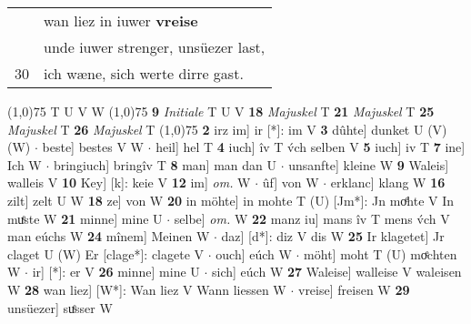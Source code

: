 \documentclass[8pt,a4paper,notitlepage]{article}
\begin{document}
\begin{table}[ht]
\begin{minipage}[t]{0.5\linewidth}
\begin{tabular}{rl}
 & wan liez in iuwer \textbf{vreise}\\ 
 & unde iuwer strenger, unsüezer last,\\ 
30 & ich wæne, sich werte dirre gast.\\ 
\end{tabular}
\scriptsize
\line(1,0){75} \newline
T U V W \newline
\line(1,0){75} \newline
\textbf{9} \textit{Initiale} T U V  \textbf{18} \textit{Majuskel} T  \textbf{21} \textit{Majuskel} T  \textbf{25} \textit{Majuskel} T  \textbf{26} \textit{Majuskel} T  \newline
\line(1,0){75} \newline
\textbf{2} irz im] ir [*]: im V \textbf{3} dûhte] dunket U (V) (W)  $\cdot$ beste] bestes V W  $\cdot$ heil] hel T \textbf{4} iuch] îv T v́ch selben V \textbf{5} iuch] iv T \textbf{7} ine] Ich W  $\cdot$ bringiuch] bringîv T \textbf{8} man] man dan U  $\cdot$ unsanfte] kleine W \textbf{9} Waleis] walleis V \textbf{10} Key] [k]: keie V \textbf{12} im] \textit{om.} W  $\cdot$ ûf] von W  $\cdot$ erklanc] klang W \textbf{16} zilt] zelt U W \textbf{18} ze] von W \textbf{20} in möhte] in mohte T (U) [Jm*]: Jn moͤhte  V In muͤste W \textbf{21} minne] mine U  $\cdot$ selbe] \textit{om.} W \textbf{22} manz iu] mans îv T mens v́ch V man eúchs W \textbf{24} mînem] Meinen W  $\cdot$ daz] [d*]: diz V dis W \textbf{25} Ir klagetet] Jr claget U (W) Er [clage*]: clagete  V  $\cdot$ ouch] eúch W  $\cdot$ möht] moht T (U) moͤchten W  $\cdot$ ir] [*]: er V \textbf{26} minne] mine U  $\cdot$ sich] eúch W \textbf{27} Waleise] walleise V waleisen W \textbf{28} wan liez] [W*]: Wan liez V Wann liessen W  $\cdot$ vreise] freisen W \textbf{29} unsüezer] suͤsser W \newline
\end{minipage}
\end{table}
\end{document}
